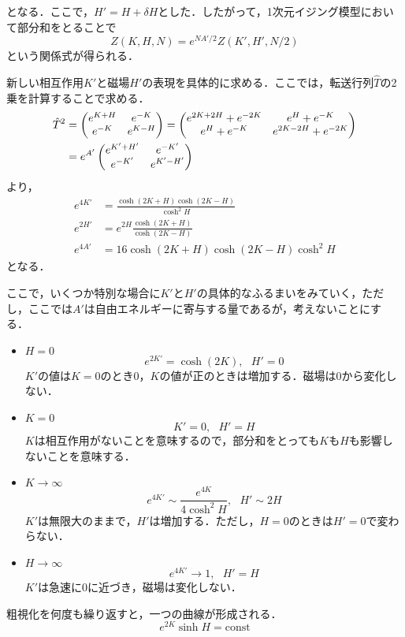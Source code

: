 \documentclass[a4paper,11pt]{jsarticle}
\begin{document}
となる．ここで，$H'=H + \delta H$とした．したがって，1次元イジング模型において部分和をとることで
\begin{equation}
  Z(K,H,N) = e^{N A' / 2} Z(K',H',N/2)
\end{equation}
という関係式が得られる．\par
新しい相互作用$K'$と磁場$H'$の表現を具体的に求める．ここでは，転送行列$\hat{T}$の2乗を計算することで求める．
\begin{align}
  \hat{T}^2
   & =
  \begin{pmatrix}
    e^{K+H} & e^{-K}  \\
    e^{-K}  & e^{K-H} \\
  \end{pmatrix}
  =
  \begin{pmatrix}
    e^{2K+2H} + e^{-2K} & e^{H} + e^{-K}      \\
    e^{H} + e^{-K}      & e^{2K-2H} + e^{-2K} \\
  \end{pmatrix}\notag \\
   & = e^{A'}
  \begin{pmatrix}
    e^{K'+H'} & e^{-K'}   \\
    e^{-K'}   & e^{K'-H'} \\
  \end{pmatrix}
\end{align}
より，
\begin{align*}
  e^{4K'} & = \frac{\cosh(2K+H)\cosh(2K-H)}{\cosh ^2H} \\
  e^{2H'} & = e^{2H} \frac{\cosh(2K+H)}{\cosh(2K-H)}   \\
  e^{4A'} & = 16\cosh(2K+H)\cosh(2K-H)\cosh ^2H
\end{align*}
となる．\par
ここで，いくつか特別な場合に$K'$と$H'$の具体的なふるまいをみていく，ただし，ここでは$A'$は自由エネルギーに寄与する量であるが，考えないことにする．
\begin{itemize}
  \item $H=0$
        \begin{equation*}
          e^{2K'} = \cosh(2K),  \ \ \  H'=0
        \end{equation*}
        $K'$の値は$K=0$のとき$0$，$K$の値が正のときは増加する．磁場は$0$から変化しない．
  \item $K=0$
        \begin{equation*}
          K' = 0,  \ \ \  H' = H
        \end{equation*}
        $K$は相互作用がないことを意味するので，部分和をとっても$K$も$H$も影響しないことを意味する．
  \item $K \rightarrow \infty$
        \begin{equation*}
          e^{4K'} \sim \frac{e^{4K}}{4\cosh^2 H}, \ \ \ H' \sim 2H
        \end{equation*}
        $K'$は無限大のままで，$H'$は増加する．ただし，$H=0$のときは$H'=0$で変わらない．
  \item $H \rightarrow \infty$
        \begin{equation*}
          e^{4K'} \rightarrow 1 , \ \ \ H'=H
        \end{equation*}
        $K'$は急速に$0$に近づき，磁場は変化しない．
\end{itemize}
粗視化を何度も繰り返すと，一つの曲線が形成される．
\begin{equation*}
  e^{2K} \sinh H = \text{const}
\end{equation*}
\end{document}
